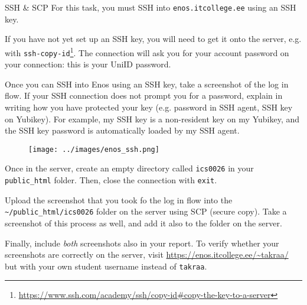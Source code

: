 \documentclass{homework}
\begin{document}
\begin{task}{SSH \& SCP}
  For this task, you must SSH into \texttt{enos.itcollege.ee} using an SSH key.

  If you have not yet set up an SSH key, you will need to get it onto the server, e.g. with \texttt{ssh-copy-id}\footnote{\url{https://www.ssh.com/academy/ssh/copy-id\#copy-the-key-to-a-server}}.
  The connection will ask you for your account password on your connection: this is your UniID password.

  Once you can SSH into Enos using an SSH key, take a screenshot of the log in flow.
  If your SSH connection does not prompt you for a password, explain in writing how you have protected your key (e.g. password in SSH agent, SSH key on Yubikey).
  For example, my SSH key is a non-resident key on my Yubikey, and the SSH key password is automatically loaded by my SSH agent.

  \begin{figure}[h!]
    \center
    \texttt{[image: ../images/enos\_ssh.png]}
  \end{figure}

  Once in the server, create an empty directory called \texttt{ics0026} in your \texttt{public\_html} folder.
  Then, close the connection with \texttt{exit}.

  Upload the screenshot that you took fo the log in flow into the \texttt{\textasciitilde/public\_html/ics0026} folder on the server using SCP (secure copy)\footnotemark{}.
  Take a screenshot of this process as well, and add it also to the folder on the server.

  Finally, include \emph{both} screenshots also in your report.
  To verify whether your screenshots are correctly on the server, visit \url{https://enos.itcollege.ee/~takraa/} but with your own student username instead of \texttt{takraa}.
\end{task}
\end{document}
